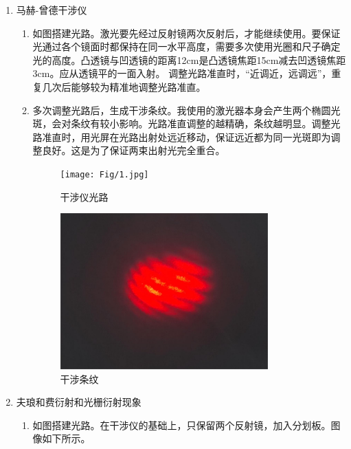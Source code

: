 \documentclass[11pt]{article}
\begin{document}
\begin{enumerate}
    \item 马赫-曾德干涉仪
    \begin{enumerate}
        \item 如图搭建光路。激光要先经过反射镜两次反射后，才能继续使用。要保证光通过各个镜面时都保持在同一水平高度，需要多次使用光圈和尺子确定光的高度。凸透镜与凹透镜的距离12cm是凸透镜焦距15cm减去凹透镜焦距3cm。应从透镜平的一面入射。
              \newline 调整光路准直时，“近调近，远调远”，重复几次后能够较为精准地调整光路准直。
        \item 多次调整光路后，生成干涉条纹。我使用的激光器本身会产生两个椭圆光斑，会对条纹有较小影响。光路准直调整的越精确，条纹越明显。调整光路准直时，用光屏在光路出射处远近移动，保证远近都为同一光斑即为调整良好。这是为了保证两束出射光完全重合。
        
        \begin{figure}[H]
            \centering
            \begin{minipage}[t]{0.49\linewidth}
                \texttt{[image: Fig/1.jpg]}
                \caption{干涉仪光路}
            \end{minipage}
            \begin{minipage}[t]{0.49\linewidth}
                \includegraphics[width=8cm]{Fig/2.jpg}
                \caption{干涉条纹}
            \end{minipage}
            
        \end{figure}

    \end{enumerate}
    \item 夫琅和费衍射和光栅衍射现象
    \begin{enumerate}
        \item 如图搭建光路。在干涉仪的基础上，只保留两个反射镜，加入分划板。图像如下所示。
        

\end{enumerate}
\end{enumerate}
\end{document}
